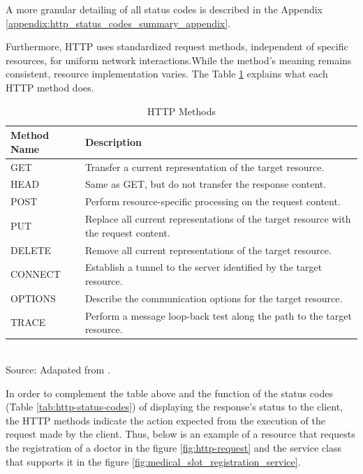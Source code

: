A more granular detailing of all status codes is described in the Appendix \ref{appendix:http_status_codes_summary_appendix}.

Furthermore, HTTP uses standardized request methods, independent of specific resources, for uniform network interactions.While the method's meaning remains consistent, resource implementation varies. The Table \ref{tab:http-methods} explains what each HTTP method does.

\begin{table}[H]
\centering
\caption{HTTP Methods}
\label{tab:http-methods}
\begin{tabular}{lp{6cm}} %
\textbf{Method Name} & \textbf{Description} \\ \hline
GET & Transfer a current representation of the target resource. \\ \hline
HEAD & Same as GET, but do not transfer the response content. \\ \hline
POST & Perform resource-specific processing on the request content. \\ \hline
PUT & Replace all current representations of the target resource with the request content. \\ \hline
DELETE & Remove all current representations of the target resource. \\ \hline
CONNECT & Establish a tunnel to the server identified by the target resource. \\\hline
OPTIONS & Describe the communication options for the target resource. \\ \hline
TRACE & Perform a message loop-back test along the path to the target resource. \\ \hline
\end{tabular}
\\ \footnotesize Source: Adapated from \cite{rfc9110}.
\end{table}

In order to complement the table above and the function of the status codes (Table \ref{tab:http-status-codes}) of displaying the response's status to the client, the HTTP methods indicate the action expected from the execution of the request made by the client. Thus, below is an example of a resource that requests the registration of a doctor in the figure \ref{fig:http-request} and the service class that supports it in the figure \ref{fig:medical_slot_registration_service}.

